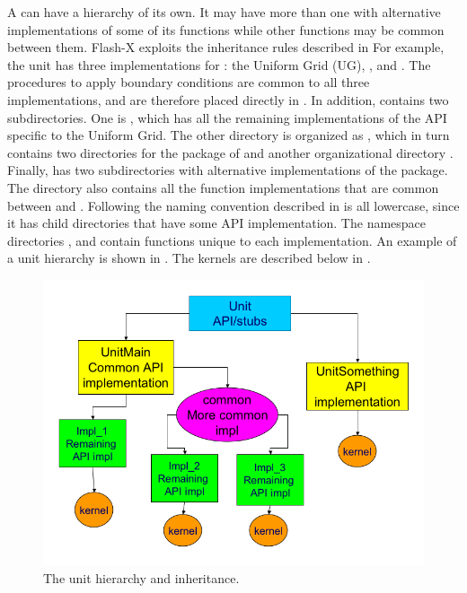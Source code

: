 A \subunit can have a hierarchy of its own. It may have more than one
\uids with alternative implementations of some of its functions
while other functions may be common between them. 
Flash-X exploits the inheritance rules described in
For example, the
 unit has three implementations for : the
Uniform Grid (UG), , and . The procedures to apply
boundary conditions are common to all three implementations, and are
therefore placed directly in . In addition,  contains
two subdirectories.  One is , which has all the remaining
implementations of the API specific to the Uniform Grid. The other
directory is organized as , which in turn contains two directories
for the package of  and another organizational directory . 
Finally,  has two subdirectories with alternative implementations of
the  package.
The directory 
also contains all the function
implementations that are common between
 and .
Following the naming
convention described in %
 is all lowercase, since it has child directories that
have some API implementation. The namespace directories ,  and contain functions 
unique to each implementation.  An example of a unit hierarchy is shown in
.  
The kernels are described below in .

\begin{figure}[ht] \begin{center}
\includegraphics[width=5.0in]{arch_unit_heirarchy}
\caption{\label{Fig:units_hierarchy} The unit hierarchy and inheritance.}
\end{center} \end{figure} 

